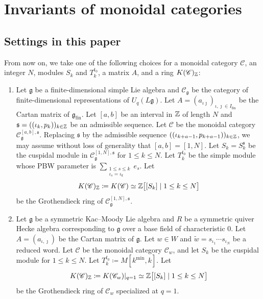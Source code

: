 \section{Invariants of monoidal categories}
\label{Sec : invariants of monoidal categories}
\subsection{Settings in this paper}\label{ssec : settings in this paper}
From now on, we take one of the following choices
for a monoidal category $\mathscr{C}$, an integer $N$,
modules $S_k$ and $T_k^{t_0}$, a matrix $A$, and a ring $K(\mathscr{C})_{\mathbb{Z}}$:
\begin{enumerate}
    \item[(i)] Let $\mathfrak{g}$ be a finite-dimensional simple Lie algebra
    and $\mathscr{C}_{\mathfrak{g}}$ be the category
    of finite-dimensional representations of $U_q(L\mathfrak{g})$. 
    Let $A = (a_{\iota \jmath})_{\iota, \jmath \in I_{\mathrm{fin}}}$ 
    be the Cartan matrix of $\mathfrak{g}_{\mathrm{fin}}$. 
    Let $[a, b]$ be an interval in $\mathbb{Z}$ of length $N$
    and $\mathfrak{s} = ((\iota_k, p_k))_{k \in \mathbb{Z}}$
    be an admissible sequence.
    Let $\mathscr{C}$ be the monoidal category
    $\mathscr{C}_{\mathfrak{g}}^{[a, b], \mathfrak{s}}$.
    Replacing $\mathfrak{s}$ by the admissible sequence
    $((\iota_{k + a - 1}, p_{k + a - 1}))_{k \in \mathbb{Z}}$,
    we may assume without loss of generality that $[a, b] = [1, N]$.
    Let $S_k = S_k^{\mathfrak{s}}$ be the cuspidal module
    in $\mathscr{C}_{\mathfrak{g}}^{[1, N], \mathfrak{s}}$
    for $1 \leq k \leq N$.
    Let $T_k^{t_0}$ be the simple module whose PBW parameter is
    $\sum_{\substack{1\leq s \leq k \\ \iota_s = \iota_k}} e_s$.
    Let
    \[
    K(\mathscr{C})_{\mathbb{Z}} \coloneq K(\mathscr{C})
    \simeq \mathbb{Z}\bigl[[S_k] \mid 1 \leq k \leq N\bigr]
    \]
    be the Grothendieck ring
    of $\mathscr{C}_{\mathfrak{g}}^{[1, N], \mathfrak{s}}$.
    \item[(ii)] Let $\mathfrak{g}$ be a symmetric Kac--Moody Lie algebra
    and $R$ be a symmetric quiver Hecke algebra
    corresponding to $\mathfrak{g}$
    over a base field of characteristic $0$. 
    Let $A = (a_{\iota, \jmath})$ be the Cartan matrix of $\mathfrak{g}$. 
    Let $w \in W$ and
    $\widetilde{w} = s_{\iota_1}\cdots s_{\iota_N}$
    be a reduced word.
    Let $\mathscr{C}$ be the monoidal category $\mathscr{C}_w$,
    and let $S_k$ be the cuspidal module for $1 \leq k \leq N$.
    Let $T_k^{t_0} \coloneq M[k^{\min}, k]$.
    Let
    \[
    K(\mathscr{C})_{\mathbb{Z}} \coloneq K(\mathscr{C}_w)|_{q = 1}
    \simeq \mathbb{Z}\bigl[[S_k] \mid 1 \leq k \leq N\bigr]
    \]
    be the Grothendieck ring of $\mathscr{C}_w$
    specialized at $q = 1$.
\end{enumerate}

